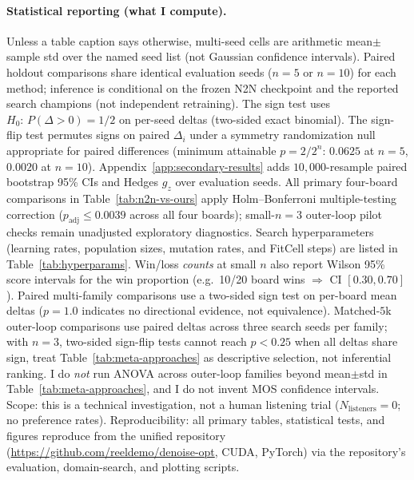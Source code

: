 \paragraph{Statistical reporting (what I compute).}
Unless a table caption says otherwise, multi-seed cells are arithmetic mean$\pm$sample std over the named seed list (not Gaussian confidence intervals).
Paired holdout comparisons share identical evaluation seeds ($n{=}5$ or $n{=}10$) for each method; inference is conditional on the frozen N2N checkpoint and the reported search champions (not independent retraining).
The sign test uses $H_0{:}\,P(\Delta{>}0){=}1/2$ on per-seed deltas (two-sided exact binomial).
The sign-flip test permutes signs on paired $\Delta_i$ under a symmetry randomization null appropriate for paired differences (minimum attainable $p{=}2/2^n$: $0.0625$ at $n{=}5$, $0.0020$ at $n{=}10$).
Appendix~\ref{app:secondary-results} adds $10{,}000$-resample paired bootstrap 95\% CIs and Hedges $g_z$ over evaluation seeds.
All primary four-board comparisons in Table~\ref{tab:n2n-vs-ours} apply Holm--Bonferroni multiple-testing correction ($p_{\mathrm{adj}}{\le}0.0039$ across all four boards); small-$n{=}3$ outer-loop pilot checks remain unadjusted exploratory diagnostics.
Search hyperparameters (learning rates, population sizes, mutation rates, and FitCell steps) are listed in Table~\ref{tab:hyperparams}.
Win/loss \emph{counts} at small $n$ also report Wilson 95\% score intervals for the win proportion (e.g.\ 10/20 board wins $\Rightarrow$ CI $[0.30,0.70]$).
Paired multi-family comparisons use a two-sided sign test on per-board mean deltas ($p{=}1.0$ indicates no directional evidence, not equivalence).
Matched-$5$k outer-loop comparisons use paired deltas across three search seeds per family; with $n{=}3$, two-sided sign-flip tests cannot reach $p<0.25$ when all deltas share sign, treat Table~\ref{tab:meta-approaches} as descriptive selection, not inferential ranking.
I do \emph{not} run ANOVA across outer-loop families beyond mean$\pm$std in Table~\ref{tab:meta-approaches}, and I do not invent MOS confidence intervals.
Scope: this is a technical investigation, not a human listening trial ($N_{\mathrm{listeners}}{=}0$; no preference rates).
Reproducibility: all primary tables, statistical tests, and figures reproduce from the unified repository (\url{https://github.com/reeldemo/denoise-opt}, CUDA, PyTorch) via the repository's evaluation, domain-search, and plotting scripts.

